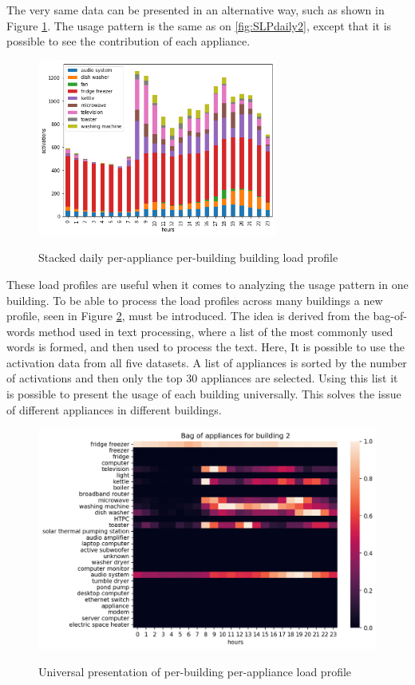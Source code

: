 The very same data can be presented in an alternative way, such as shown in Figure \ref{fig:stack}.
The usage pattern is the same as on \ref{fig:SLPdaily2}, except that it is possible to see
the contribution of each appliance. 

\begin{figure}[H]
	\centering
	\caption{Stacked daily per-appliance per-building building load profile}
	\includegraphics[width=0.7\textwidth]{../Figures/LPS/stack.png}
	\label{fig:stack}
\end{figure}

These load profiles are useful when it comes to analyzing the usage pattern in one building.
To be able to process the load profiles across many buildings a new profile, seen in Figure \ref{fig:BOA}, must be introduced.
The idea is derived from the bag-of-words method used in text processing, where a list of the most commonly used words is formed, and then used to process the text. 
Here, It is possible to use the activation data from all five datasets.
A list of appliances is sorted by the number of activations and then only the top 30 appliances are selected.
Using this list it is possible to present the usage of each building universally. This solves the issue of different appliances in different buildings.


\begin{figure}[H]
	\centering
	\caption{Universal presentation of per-building per-appliance load profile}
	\includegraphics[width=1\textwidth]{../Figures/LPS/BOA.png}
	\label{fig:BOA}
\end{figure}

